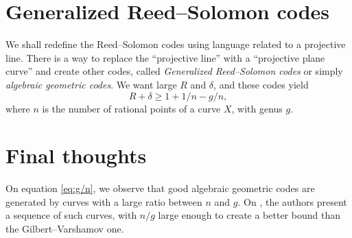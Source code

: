 \documentclass[11pt, letterpaper]{amsart}
\theoremstyle{definition}
\begin{document}
\section{Generalized Reed--Solomon codes} \label{s:grs}
We shall redefine the Reed--Solomon codes using language related to a projective line. There is a way to replace the ``projective line'' with a ``projective plane curve'' and create other codes, called \emph{Generalized Reed--Solomon codes} or simply \emph{algebraic geometric codes}. We want large $R$ and $\delta$, and these codes yield \begin{equation}\label{eq:g/n} R + \delta \ge 1 + 1/n - g/n,\end{equation} where $n$ is the number of rational points of a curve $X$, with genus $g$.

\section{Final thoughts} \label{s:tvz} On equation \eqref{eq:g/n}, we observe that good algebraic geometric codes are generated by curves with a large ratio between $n$ and $g$. On \cite{TVZ82}, the authors present a sequence of such curves, with $n/g$ large enough to create a better bound than the Gilbert--Varshamov one.
\end{document}
